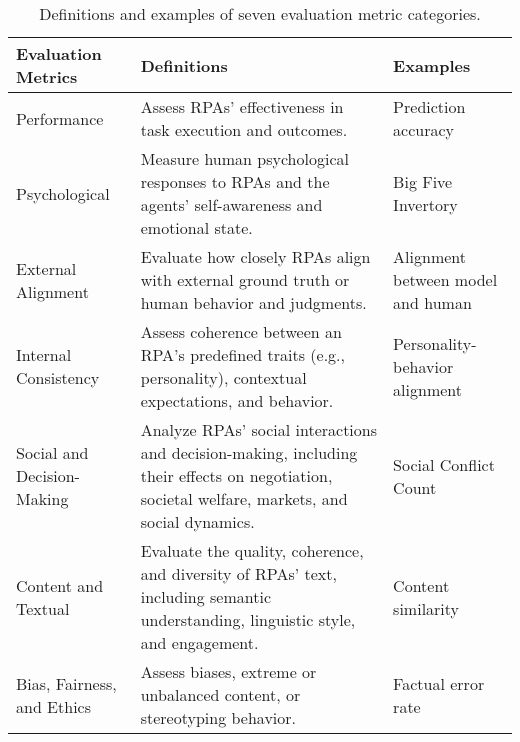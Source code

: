 \begin{table*}[]
\small
\caption{Definitions and examples of seven evaluation metric categories.}
\begin{tabular}{@{}p{}p{}p{}@{}}
\toprule
\textbf{Evaluation Metrics}                   & \textbf{Definitions}          & \textbf{Examples}                                                                                                                    \\ \midrule
Performance                 & Assess RPAs' effectiveness in task execution and outcomes.  & Prediction accuracy                                                                                     \\ 
Psychological               & Measure human psychological responses to RPAs and the agents' self-awareness and emotional state.      & Big Five Invertory                                          \\ 
External Alignment          & Evaluate how closely RPAs align with external ground truth or human behavior and judgments.  & Alignment between model and human                                                  \\ 
Internal Consistency        & Assess coherence between an RPA’s predefined traits (e.g., personality), contextual expectations, and behavior. & Personality-behavior alignment                                  \\ 
Social and Decision-Making  & Analyze RPAs' social interactions and decision-making, including their effects on negotiation, societal welfare, markets, and social dynamics. & Social Conflict Count  \\ 
Content and Textual        & Evaluate the quality, coherence, and diversity of RPAs' text, including semantic understanding, linguistic style, and engagement.  & Content similarity               \\ 
Bias, Fairness, and Ethics  & Assess biases, extreme or unbalanced content, or stereotyping behavior.   & Factual error rate                                                                        \\ \bottomrule
\end{tabular}
\label{metrics_def}
\end{table*}
